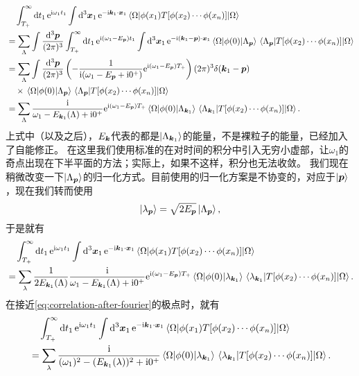 \documentclass[hyperref, UTF8, a4paper]{ctexart}
\newcommand*{\ii}{\mathrm{i}}
\newcommand*{\ee}{\mathrm{e}}
\begin{document}
\[
    \begin{aligned}
        &\quad \int_{T_+}^{\infty} \dd{t_1} \ee^{\ii \omega_1 t_1} \int \dd[3]{\vb*{x}_1} \ee^{- \ii \vb*{k}_1 \cdot \vb*{x}_1} \mel{\Omega}{\phi(x_1) T [\phi(x_2) \cdots \phi(x_n)]}{\Omega} \\
        &= \sum_{\Lambda} \int \frac{\dd[3]{\vb*{p}}}{(2\pi)^3} \int_{T_+}^{\infty} \dd{t_1} \ee^{\ii (\omega_1 - E_{\vb*{p}}) t_1} \int \dd[3]{\vb*{x}_1} \ee^{- \ii (\vb*{k}_1 - \vb*{p}) \cdot \vb*{x}_1} \mel*{\Omega}{\phi(0)}{\Lambda_{\vb*{p}}} \mel*{\Lambda_{\vb*{p}}}{T [\phi(x_2) \cdots \phi(x_n)]}{\Omega} \\
        &= \sum_{\Lambda} \int \frac{\dd[3]{\vb*{p}}}{(2\pi)^3} \left( - \frac{1}{\ii (\omega_1 - E_{\vb*{p}} + \ii 0^+)} \ee^{\ii (\omega_1 - E_{\vb*{p}}) T_+} \right) (2\pi)^3 \delta(\vb*{k}_1 - \vb*{p}) \\
        & \quad \times \mel*{\Omega}{\phi(0)}{\Lambda_{\vb*{p}}} \mel*{\Lambda_{\vb*{p}}}{T [\phi(x_2) \cdots \phi(x_n)]}{\Omega} \\
        &= \sum_{\Lambda} \frac{\ii}{\omega_1 - E_{\vb*{k}_1}(\Lambda) + \ii 0^+} \ee^{\ii (\omega_1 - E_{\vb*{p}}) T_+} \mel*{\Omega}{\phi(0)}{\Lambda_{\vb*{k}_1}} \mel*{\Lambda_{\vb*{k}_1}}{T [\phi(x_2) \cdots \phi(x_n)]}{\Omega}.
    \end{aligned}
\]
上式中（以及之后），$E_{\vb*{k}}$代表的都是$\ket{\Lambda_{\vb*{k}_1}}$的能量，不是裸粒子的能量，已经加入了自能修正。
在这里我们使用标准的在对时间的积分中引入无穷小虚部，让$\omega_1$的奇点出现在下半平面的方法；实际上，如果不这样，积分也无法收敛。
我们现在稍微改变一下$\ket{\Lambda_{\vb*{p}}}$的归一化方式。目前使用的归一化方案是不协变的，对应于$\ket{\vb*{p}}$，现在我们转而使用
\[
    \ket{\lambda_{\vb*{p}}} = \sqrt{2 E_{\vb*{p}}} \ket{\Lambda_{\vb*{p}}},
\]
于是就有
\[
    \begin{aligned}
        &\quad \int_{T_+}^{\infty} \dd{t_1} \ee^{\ii \omega_1 t_1} \int \dd[3]{\vb*{x}_1} \ee^{- \ii \vb*{k}_1 \cdot \vb*{x}_1} \mel{\Omega}{\phi(x_1) T [\phi(x_2) \cdots \phi(x_n)]}{\Omega} \\
        &= \sum_{\lambda} \frac{1}{2E_{\vb*{k}_1}(\Lambda)} \frac{\ii}{\omega_1 - E_{\vb*{k}_1}(\Lambda) + \ii 0^+} \ee^{\ii (\omega_1 - E_{\vb*{p}}) T_+} \mel*{\Omega}{\phi(0)}{\lambda_{\vb*{k}_1}} \mel*{\lambda_{\vb*{k}_1}}{T [\phi(x_2) \cdots \phi(x_n)]}{\Omega}.
    \end{aligned}
\]
在接近\eqref{eq:correlation-after-fourier}的极点时，就有
\[
    \begin{aligned}
        &\quad \int_{T_+}^{\infty} \dd{t_1} \ee^{\ii \omega_1 t_1} \int \dd[3]{\vb*{x}_1} \ee^{- \ii \vb*{k}_1 \cdot \vb*{x}_1} \mel{\Omega}{\phi(x_1) T [\phi(x_2) \cdots \phi(x_n)]}{\Omega} \\
        &= \sum_{\lambda} \frac{\ii}{(\omega_1)^2 - (E_{\vb*{k}_1}(\lambda))^2 + \ii 0^+} \mel*{\Omega}{\phi(0)}{\lambda_{\vb*{k}_1}} \mel*{\lambda_{\vb*{k}_1}}{T [\phi(x_2) \cdots \phi(x_n)]}{\Omega}.
    \end{aligned}
\]
\end{document}
